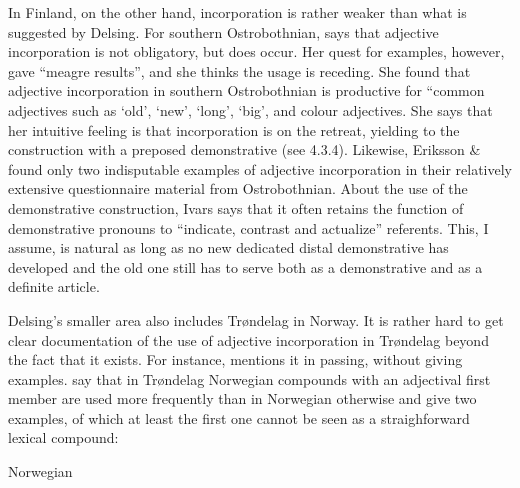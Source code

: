 
In Finland, on the other hand, incorporation is rather weaker than what is suggested by Delsing. For southern Ostrobothnian, \citet{Ivars2005} says that adjective incorporation is not obligatory, but does occur. Her quest for examples, however, gave “meagre results”, and she thinks the usage is receding. She found that adjective incorporation in southern Ostrobothnian is productive for “common adjectives such as  ‘old’,  ‘new’,  ‘long’,  ‘big’, and colour adjectives. She says that her intuitive feeling is that incorporation is on the retreat, yielding to the construction with a preposed demonstrative (see 4.3.4).  Likewise, Eriksson \& \citet{Rendahl1999} found only two indisputable examples of adjective incorporation in their relatively extensive questionnaire material from Ostrobothnian. About the use of the demonstrative construction, Ivars says that it often retains the function of demonstrative pronouns to “indicate, contrast and actualize” referents. This, I assume, is natural as long as no new dedicated distal demonstrative has developed and the old one still has to serve both as a demonstrative and as a definite article. 


Delsing’s smaller area also includes Trøndelag in Norway. It is rather hard to get clear documentation of the use of adjective incorporation in Trøndelag beyond the fact that it exists. For instance, \citet[161]{Vangsnes2003} mentions it in passing, without giving examples. \citet[161]{FaarlundEtAl1997} say that in Trøndelag Norwegian compounds with an adjectival first member are used more frequently than in Norwegian otherwise and give two examples, of which at least the first one cannot be seen as a straighforward lexical compound: 


\item 

Norwegian 


